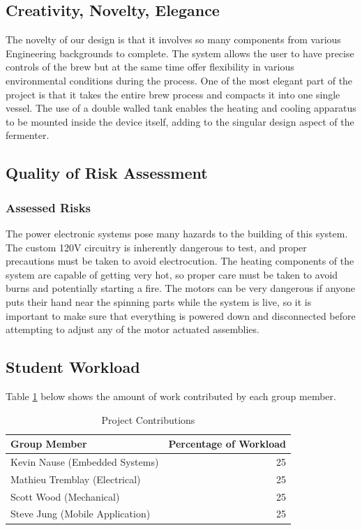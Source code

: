 \documentclass{article}
\begin{document}
\subsection{Creativity, Novelty, Elegance}
The novelty of our design is that it involves so many components from various Engineering backgrounds to complete. The system allows the user to have precise controls of the brew but at the same time offer flexibility in various environmental conditions during the process. One of the most elegant part of the project is that it takes the entire brew process and compacts it into one single vessel. The use of a double walled tank enables the heating and cooling apparatus to be mounted inside the device itself, adding to the singular design aspect of the fermenter.

\subsection{Quality of Risk Assessment}
\subsubsection{Assessed Risks}
The power electronic systems pose many hazards to the building of this system. The custom 120V circuitry is inherently dangerous to test, and proper precautions must be taken to avoid electrocution. The heating components of the system are capable of getting very hot, so proper care must be taken to avoid burns and potentially starting a fire. The motors can be very dangerous if anyone puts their hand near the spinning parts while the system is live, so it is important to make sure that everything is powered down and disconnected before attempting to adjust any of the motor actuated assemblies.

\pagebreak
\subsection{Student Workload}
Table \ref{tab:workload-percentage} below shows the amount of work contributed by each group member.
\begin{table}[H]
\centering
\caption{Project Contributions}
\label{tab:workload-percentage}
\begin{tabular}{lr}
\toprule
\textbf{Group Member} 	& \textbf{Percentage of Workload}\\ 
\midrule
Kevin Nause (Embedded Systems)		&        25               \\
Mathieu Tremblay (Electrical)		&        25               \\
Scott Wood (Mechanical)				&        25               \\
Steve Jung (Mobile Application)		& 		 25				  \\
\bottomrule
\end{tabular}
\end{table}
\end{document}
